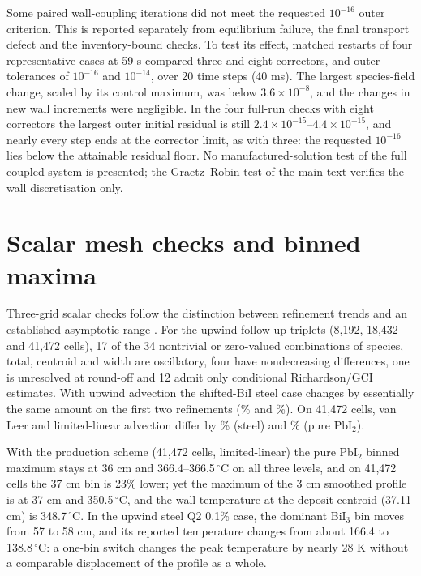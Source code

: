 \documentclass{article}
\begin{document}
Some paired wall-coupling iterations did not meet the requested
$10^{-16}$ outer criterion. This is reported separately from
equilibrium failure, the final transport defect and the inventory-bound
checks. To test its effect, matched restarts of four representative
cases at 59 s compared three and eight correctors, and outer
tolerances of $10^{-16}$ and $10^{-14}$, over 20 time steps (40 ms).
The largest species-field change, scaled by its control maximum, was
below $3.6\times10^{-8}$, and the changes in new wall increments were
negligible. In the four full-run checks with eight correctors the
largest outer initial residual is still
$2.4\times10^{-15}$--$4.4\times10^{-15}$, and nearly every step ends at
the corrector limit, as with three: the requested $10^{-16}$ lies below
the attainable residual floor. No manufactured-solution test of the
full coupled system is presented; the Graetz--Robin test of the main
text verifies the wall discretisation only.

\section{Scalar mesh checks and binned maxima}
\label{sec:s-mesh}
Three-grid scalar checks follow the distinction between refinement
trends and an established asymptotic range
\cite{NASAGridConvergence,Roache1994perspective,Celik2008procedure}.
For the upwind follow-up triplets (8,192, 18,432 and 41,472 cells), 17
of the 34 nontrivial or zero-valued combinations of species, total,
centroid and width are oscillatory, four have nondecreasing
differences, one is unresolved at round-off and 12 admit only
conditional Richardson/GCI estimates. With upwind advection the
shifted-BiI steel case changes by essentially the same amount on the
first two refinements (\SteelUpOne\% and \SteelUpTwo\%). On 41,472
cells, van Leer and limited-linear advection differ by \VLSteelThree\%
(steel) and \VLPureThree\% (pure PbI$_2$).

With the production scheme (41,472 cells, limited-linear) the pure
PbI$_2$ binned maximum stays at 36 cm and 366.4--366.5\,$^\circ$C on all
three levels, and on 41,472 cells the 37 cm bin is 23\% lower; yet the
maximum of the 3 cm smoothed profile is at 37 cm and 350.5\,$^\circ$C,
and the wall temperature at the deposit centroid (37.11 cm) is
348.7\,$^\circ$C. In the upwind steel Q2 0.1\% case, the dominant
BiI$_3$ bin moves from 57 to 58 cm, and its reported temperature changes
from about 166.4 to 138.8\,$^\circ$C: a one-bin switch changes the peak
temperature by nearly 28 K without a comparable displacement of the
profile as a whole.
\end{document}
